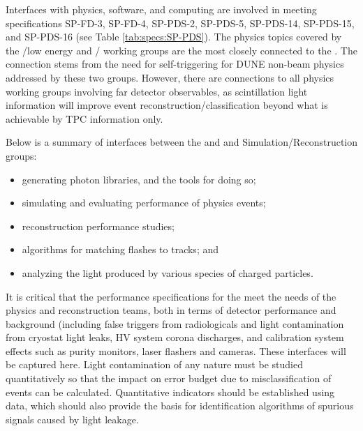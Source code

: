 Interfaces with physics, software, and computing are involved in meeting specifications SP-FD-3, SP-FD-4, SP-PDS-2, SP-PDS-5, 
SP-PDS-14, SP-PDS-15, and SP-PDS-16 (see Table \ref{tab:specs:SP-PDS}). The physics topics covered by the
/low energy and / working groups are the most closely connected to the \single {}. The connection stems from the need for self-triggering for DUNE non-beam physics addressed by these two groups. 
However, there are connections to all physics working groups involving far detector observables, as scintillation light information will improve event reconstruction/classification beyond what is achievable by TPC information only. 

Below is a summary of interfaces between the \dune \single {} and  and  Simulation/Reconstruction groups:

\begin{itemize}
    \item generating photon libraries, and the tools for doing so;
    \item simulating and evaluating performance of physics events;
    \item \single {} reconstruction performance studies;
    \item algorithms for matching flashes to  tracks; and
    \item analyzing the light produced by various species of charged particles.
\end{itemize}

It is critical that the performance specifications for the  meet the needs of the physics and reconstruction teams, both in terms of detector performance and background (including false triggers from radiologicals and light contamination from cryostat light leaks, HV system corona discharges, and calibration system effects such as purity monitors, laser flashers and cameras.  These interfaces will be captured here.
Light contamination of any nature must be studied quantitatively so that the impact on error budget due to misclassification of events can be calculated. Quantitative indicators should be established using  data, which should also provide the basis for identification algorithms of spurious signals caused by light leakage. 

